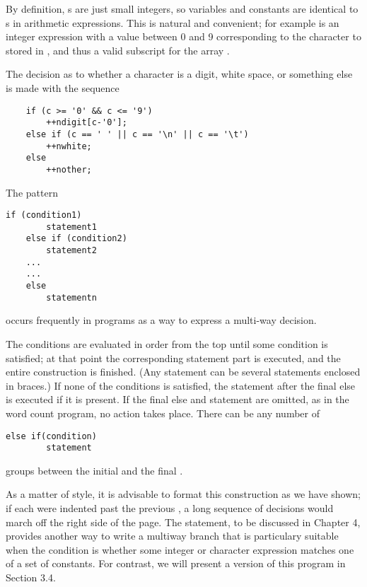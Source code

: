 By definition, s are just small integers, so  variables and constants are identical to s in arithmetic expressions.
This is natural and convenient; for example  is an integer expression with a value between 0 and 9 corresponding to the character  to  stored in , and thus a valid subscript for the array .

The decision as to whether a character is a digit, white space, or something else is made with the sequence
\begin{lstlisting}
	if (c >= '0' && c <= '9')
		++ndigit[c-'0'];
	else if (c == ' ' || c == '\n' || c == '\t')
		++nwhite;
	else
		++nother;
\end{lstlisting}
The pattern
\begin{lstlisting}[basicstyle=\ttfamily\normalsize\itshape, keywordstyle=\color{black}]
	if (condition1)
		statement1
	else if (condition2)
		statement2
	...
	...
	else
		statementn
\end{lstlisting}
occurs frequently in programs as a way to express a multi-way decision.

The conditions are evaluated in order from the top until some condition is satisfied; at that point the corresponding statement part is executed, and the entire construction is finished.
(Any statement can be several statements enclosed in braces.)
If none of the conditions is satisfied, the statement after the final else is executed if it is present.
If the final else and statement are omitted, as in the word count program, no action takes place.
There can be any number of
\begin{lstlisting}[basicstyle=\ttfamily\normalsize\itshape, keywordstyle=\color{black}]
	else if(condition)
		statement
\end{lstlisting}
groups between the initial  and the final .

As a matter of style, it is advisable to format this construction as we have shown; if each  were indented past the previous , a long sequence of decisions would march off the right side of the page.
The  statement, to be discussed in Chapter 4, provides another way to write a multiway branch that is particulary suitable when the condition is whether some integer or character expression matches one of a set of constants.
For contrast, we will present a  version of this program in Section 3.4.
\newline

